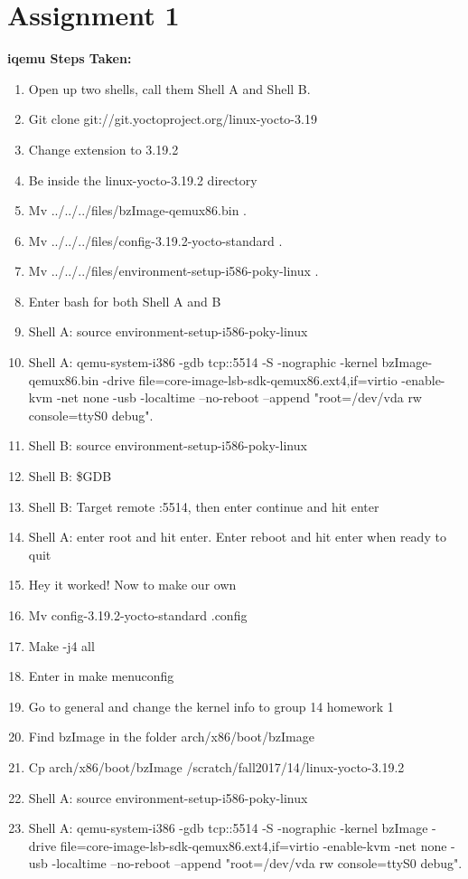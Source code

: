 \documentclass[letterpaper,10pt,fleqn]{article}
\begin{document}
\section* {Assignment 1}

\textbf{iqemu Steps Taken:}
	\begin{enumerate}
	\item Open up two shells, call them Shell A and Shell B.
	\item Git clone git://git.yoctoproject.org/linux-yocto-3.19
	\item Change extension to 3.19.2
	\item Be inside the linux-yocto-3.19.2 directory
	\item Mv ../../../files/bzImage-qemux86.bin .
	\item Mv ../../../files/config-3.19.2-yocto-standard .
	\item Mv ../../../files/environment-setup-i586-poky-linux .
	\item Enter bash for both Shell A and B
	\item Shell A: source environment-setup-i586-poky-linux
	\item Shell A: qemu-system-i386 -gdb tcp::5514 -S -nographic -kernel bzImage-qemux86.bin -drive file=core-image-lsb-sdk-qemux86.ext4,if=virtio -enable-kvm -net none -usb -localtime --no-reboot --append "root=/dev/vda rw console=ttyS0 debug".
	\item Shell B: source environment-setup-i586-poky-linux
	\item Shell B: \$GDB
	\item Shell B: Target remote :5514, then enter continue and hit enter
	\item Shell A: enter root and hit enter. Enter reboot and hit enter when ready to quit
	\item Hey it worked! Now to make our own
	\item Mv config-3.19.2-yocto-standard .config
	\item Make -j4 all
	\item Enter in make menuconfig
	\item Go to general and change the kernel info to group 14 homework 1
	\item Find bzImage in the folder arch/x86/boot/bzImage
	\item Cp arch/x86/boot/bzImage /scratch/fall2017/14/linux-yocto-3.19.2
	\item Shell A: source environment-setup-i586-poky-linux
	\item Shell A: qemu-system-i386 -gdb tcp::5514 -S -nographic -kernel bzImage -drive file=core-image-lsb-sdk-qemux86.ext4,if=virtio -enable-kvm -net none -usb -localtime --no-reboot --append "root=/dev/vda rw console=ttyS0 debug".

\end{enumerate}
\end{document}
